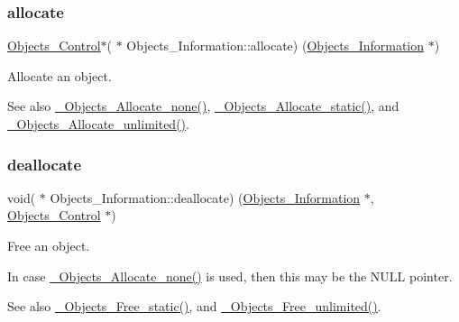\subsubsection{\texorpdfstring{allocate}{allocate}}
{\footnotesize\ttfamily \mbox{\hyperlink{structObjects__Control}{Objects\+\_\+\+Control}}$\ast$( $\ast$ Objects\+\_\+\+Information\+::allocate) (\mbox{\hyperlink{structObjects__Information}{Objects\+\_\+\+Information}} $\ast$)}



Allocate an object. 

\begin{DoxySeeAlso}{See also}
\mbox{\hyperlink{group__RTEMSScoreObject_gab0861c8e235b2892f2785b6cf582c74e}{\+\_\+\+Objects\+\_\+\+Allocate\+\_\+none()}}, \mbox{\hyperlink{group__RTEMSScoreObject_ga93a072e4b17ff04e60d29e57e6901ce1}{\+\_\+\+Objects\+\_\+\+Allocate\+\_\+static()}}, and \mbox{\hyperlink{group__RTEMSScoreObject_ga0a7f6c580a3b8f84842df598a283b890}{\+\_\+\+Objects\+\_\+\+Allocate\+\_\+unlimited()}}. 
\end{DoxySeeAlso}
\mbox{\label{structObjects__Information_a96ea4d5b8aed745245138190485220f6}} 
\subsubsection{\texorpdfstring{deallocate}{deallocate}}
{\footnotesize\ttfamily void( $\ast$ Objects\+\_\+\+Information\+::deallocate) (\mbox{\hyperlink{structObjects__Information}{Objects\+\_\+\+Information}} $\ast$, \mbox{\hyperlink{structObjects__Control}{Objects\+\_\+\+Control}} $\ast$)}



Free an object. 

In case \mbox{\hyperlink{group__RTEMSScoreObject_gab0861c8e235b2892f2785b6cf582c74e}{\+\_\+\+Objects\+\_\+\+Allocate\+\_\+none()}} is used, then this may be the N\+U\+LL pointer.

\begin{DoxySeeAlso}{See also}
\mbox{\hyperlink{group__RTEMSScoreObject_ga080ce791a8c319fbad853973fa53cf58}{\+\_\+\+Objects\+\_\+\+Free\+\_\+static()}}, and \mbox{\hyperlink{group__RTEMSScoreObject_gae07a394b03c4cb77414045f2fca32e62}{\+\_\+\+Objects\+\_\+\+Free\+\_\+unlimited()}}. 
\end{DoxySeeAlso}
\mbox{\label{structObjects__Information_a82080af967cdcab49e96eee49318e6fe}} 

